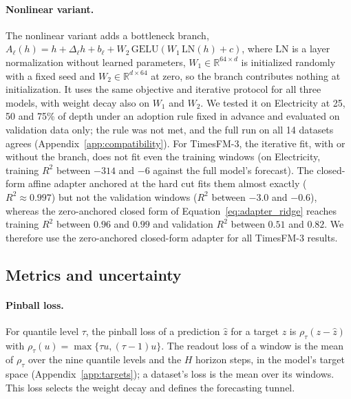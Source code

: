 \documentclass{article} %
\begin{document}
\paragraph{Nonlinear variant.} The nonlinear variant adds a bottleneck branch,
$A_\ell(h)=h+\Delta_\ell h+b_\ell+W_2\,\mathrm{GELU}(W_1\,\mathrm{LN}(h)+c)$, where $\mathrm{LN}$ is
a layer normalization without learned parameters, $W_1\in\mathbb{R}^{64\times d}$ is initialized
randomly with a fixed seed and $W_2\in\mathbb{R}^{d\times 64}$ at zero, so the branch contributes
nothing at initialization. It uses the same objective and iterative protocol for all three models,
with weight decay also on $W_1$ and $W_2$. We tested it on Electricity at 25, 50 and 75\% of depth
under an adoption rule fixed in advance and evaluated on validation data only; the rule was not met,
and the full run on all 14 datasets agrees (Appendix~\ref{app:compatibility}). For TimesFM-3, the
iterative fit, with or without the branch, does not fit even the training windows (on Electricity,
training $R^2$ between $-314$ and $-6$ against the full model's forecast). The closed-form affine
adapter anchored at the hard cut fits them almost exactly ($R^2\approx0.997$) but not the validation
windows ($R^2$ between $-3.0$ and $-0.6$), whereas the zero-anchored closed form of
Equation~\ref{eq:adapter_ridge} reaches training $R^2$ between $0.96$ and $0.99$ and validation $R^2$
between $0.51$ and $0.82$. We therefore use the zero-anchored closed-form adapter for all TimesFM-3
results.


\subsection{Metrics and uncertainty}
\label{app:metrics}

\paragraph{Pinball loss.} For quantile level $\tau$, the pinball loss of a prediction $\hat z$
for a target $z$ is $\rho_\tau(z-\hat z)$ with $\rho_\tau(u)=\max\{\tau u,(\tau-1)u\}$. The
readout loss of a window is the mean of $\rho_\tau$ over the nine quantile levels and the $H$
horizon steps, in the model's target space (Appendix~\ref{app:targets}); a dataset's loss is the
mean over its windows. This loss selects the weight decay and defines the forecasting tunnel.
\end{document}
